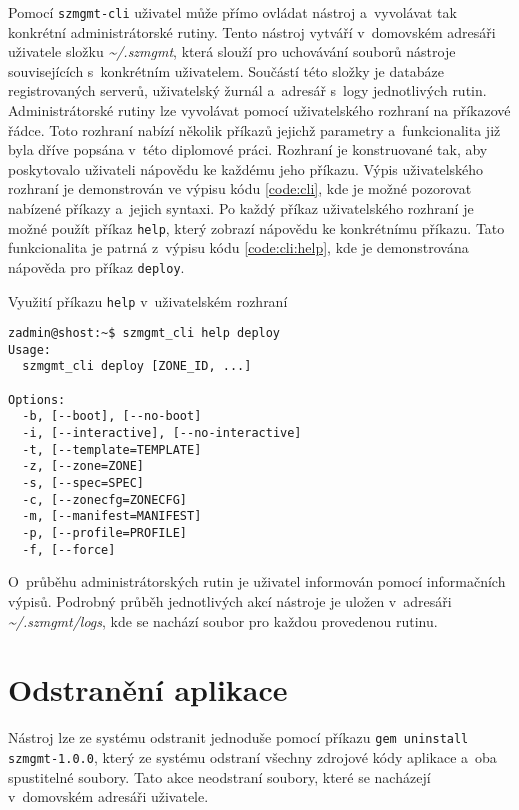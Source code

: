 Pomocí \texttt{szmgmt-cli} uživatel může přímo ovládat nástroj a~vyvolávat tak konkrétní administrátorské rutiny. Tento nástroj
vytváří v~domovském adresáři uživatele složku \textit{\textasciitilde/.szmgmt}, která slouží pro uchovávání souborů nástroje
souvisejících s~konkrétním uživatelem. Součástí této složky je databáze registrovaných serverů, uživatelský žurnál a~adresář
s~logy jednotlivých rutin. Administrátorské rutiny lze vyvolávat pomocí uživatelského rozhraní na příkazové řádce. Toto rozhraní
nabízí několik příkazů jejichž parametry a~funkcionalita již byla dříve popsána v~této diplomové práci. Rozhraní je konstruované
tak, aby poskytovalo uživateli nápovědu ke každému jeho příkazu. Výpis uživatelského rozhraní je demonstrován ve výpisu kódu
\ref{code:cli}, kde je možné pozorovat nabízené příkazy a~jejich syntaxi. Po každý příkaz uživatelského rozhraní je možné použít
příkaz \texttt{help}, který zobrazí nápovědu ke konkrétnímu příkazu. Tato funkcionalita je patrná z~výpisu kódu \ref{code:cli:help},
kde je demonstrována nápověda pro příkaz \texttt{deploy}.
\begin{listing} 
 \caption{Využití příkazu \texttt{help} v~uživatelském rozhraní}
 \begin{verbatim}
zadmin@shost:~$ szmgmt_cli help deploy
Usage:
  szmgmt_cli deploy [ZONE_ID, ...]

Options:
  -b, [--boot], [--no-boot]      
  -i, [--interactive], [--no-interactive]
  -t, [--template=TEMPLATE]
  -z, [--zone=ZONE]
  -s, [--spec=SPEC]
  -c, [--zonecfg=ZONECFG]
  -m, [--manifest=MANIFEST]
  -p, [--profile=PROFILE]
  -f, [--force]
 \end{verbatim}
 \label{code:cli:help}
\end{listing}
O~průběhu administrátorských rutin je uživatel informován pomocí informačních výpisů. Podrobný průběh jednotlivých akcí nástroje
je uložen v~adresáři \textit{\textasciitilde/.szmgmt/logs}, kde se nachází soubor pro každou provedenou rutinu.
\section{Odstranění aplikace}
\label{appendix:installation:delete}
Nástroj lze ze systému odstranit jednoduše pomocí příkazu \texttt{gem uninstall szmgmt-1.0.0}, který ze systému odstraní všechny
zdrojové kódy aplikace a~oba spustitelné soubory. Tato akce neodstraní soubory, které se nacházejí v~domovském adresáři uživatele.